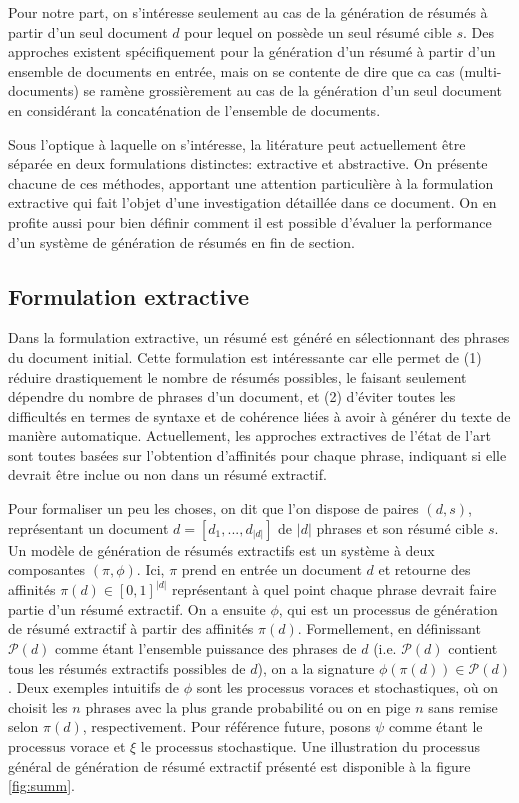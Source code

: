 Pour notre part, on s'intéresse seulement au cas de la génération de résumés à partir
d'un seul document $d$ pour lequel on possède un seul résumé cible $s$.
Des approches existent spécifiquement pour la génération d'un résumé
à partir d'un ensemble de documents en entrée, mais on se contente
de dire que ca cas (multi-documents) se ramène grossièrement au cas de la génération d'un seul
document en considérant la concaténation de l'ensemble de documents.

Sous l'optique à laquelle on s'intéresse, la litérature peut actuellement être 
séparée en deux formulations distinctes: extractive et abstractive.
On présente chacune de ces méthodes, apportant une attention 
particulière à la formulation extractive qui fait l'objet 
d'une investigation détaillée dans ce document.
On en profite aussi pour bien définir comment il est possible 
d'évaluer la performance d'un système de génération de résumés 
en fin de section.

\subsection{Formulation extractive}
\label{sec:extractive}

Dans la formulation extractive, un résumé est généré en sélectionnant 
des phrases du document initial.
Cette formulation est intéressante car elle permet 
de (1) réduire drastiquement le nombre de résumés possibles, le faisant 
seulement dépendre du nombre de phrases d'un document, et (2) d'éviter 
toutes les difficultés en termes de syntaxe
et de cohérence liées à avoir à générer du texte de manière automatique.
Actuellement, les approches extractives de l'état de l'art sont
toutes basées sur l'obtention d'affinités pour chaque phrase, indiquant
si elle devrait être inclue ou non dans un résumé extractif.

Pour formaliser un peu les choses, on dit que l'on dispose de paires $(d,s)$,
représentant un document $d=[d_1, ..., d_{|d|}]$ de $|d|$ phrases
et son résumé cible $s$.
Un modèle de génération de résumés extractifs est un système à deux composantes 
$(\pi, \phi)$.
Ici, $\pi$ prend en entrée un document $d$ et retourne des affinités
$\pi(d) \in [0, 1]^{|d|}$ représentant à quel 
point chaque phrase devrait faire partie d'un résumé extractif.
On a ensuite $\phi$, qui est un processus de génération de résumé
extractif à partir des affinités $\pi(d)$.
Formellement, en définissant $\mathscr{P}(d)$ comme étant l'ensemble puissance 
des phrases de $d$ (i.e. $\mathscr{P}(d)$ contient tous les résumés extractifs possibles
de $d$), on a la signature $\phi(\pi(d)) \in \mathscr{P}(d)$.
Deux exemples intuitifs de $\phi$ sont les processus voraces et stochastiques,
où on choisit les $n$ phrases avec la plus grande probabilité ou on en pige
$n$ sans remise selon $\pi(d)$, respectivement.
Pour référence future, posons $\psi$ comme étant le processus vorace et
$\xi$ le processus stochastique.
Une illustration du processus général de génération de résumé extractif présenté
est disponible à la figure \ref{fig:summ}.


